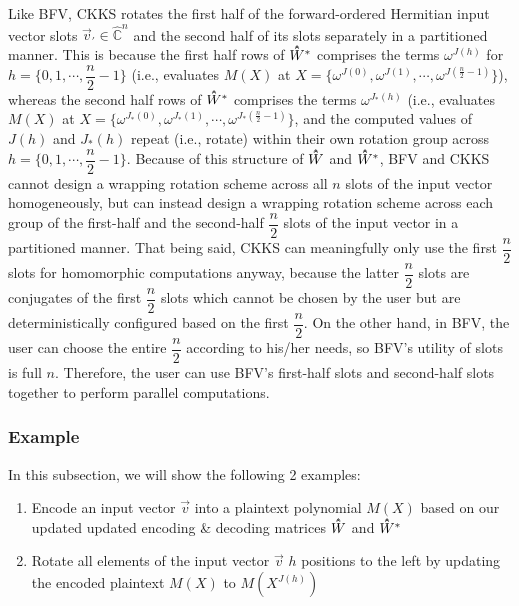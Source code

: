  Like BFV, CKKS rotates the first half of the forward-ordered Hermitian input vector slots $\vec{v}_{'} \in \mathbb{\hat{C}}^n$ and the second half of its slots separately in a partitioned manner. This is because the first half rows of $\hathat{W}^*$ comprises the terms $\omega^{J(h)}$ for $h = \{0, 1, \cdots, \dfrac{n}{2} - 1\}$ (i.e., evaluates $M(X)$ at $X=\{\omega^{J(0)}, \omega^{J(1)}, \cdots, \omega^{J(\frac{n}{2}-1)}\}$), whereas the second half rows of $\hathat{W}^*$ comprises the terms $\omega^{J_*(h)}$ (i.e., evaluates $M(X)$ at $X=\{\omega^{J_*(0)}, \omega^{J_*(1)}, \cdots, \omega^{J_*(\frac{n}{2}-1)}\}$, and the computed values of $J(h)$ and $J_*(h)$ repeat (i.e., rotate) within their own rotation group across $h=\{0, 1, \cdots, \dfrac{n}{2} - 1\}$. Because of this structure of $\hathat W$ and $\hathat W^*$, BFV and CKKS cannot design a wrapping rotation scheme across all $n$ slots of the input vector homogeneously, but can instead design a wrapping rotation scheme across each group of the first-half and the second-half $\dfrac{n}{2}$ slots of the input vector in a partitioned manner. That being said, CKKS can meaningfully only use the first $\dfrac{n}{2}$ slots for homomorphic computations anyway, because the latter $\dfrac{n}{2}$ slots are conjugates of the first $\dfrac{n}{2}$ slots which cannot be chosen by the user but are deterministically configured based on the first $\dfrac{n}{2}$. On the other hand, in BFV, the user can choose the entire $\dfrac{n}{2}$ according to his/her needs, so BFV's utility of slots is full $n$. Therefore, the user can use BFV's first-half slots and second-half slots together to perform parallel computations. 




\subsubsection{Example}
\label{subsubsec:ckks-rotation-ex}

In this subsection, we will show the following 2 examples:
\begin{enumerate}
\item Encode an input vector $\vec{v}$ into a plaintext polynomial $M(X)$ based on our updated updated encoding \& decoding matrices $\hathat W$ and $\hathat W^*$
\item Rotate all elements of the input vector $\vec{v}$ $h$ positions to the left by updating the encoded plaintext $M(X)$ to $M(X^{J(h)})$
\end{enumerate}

